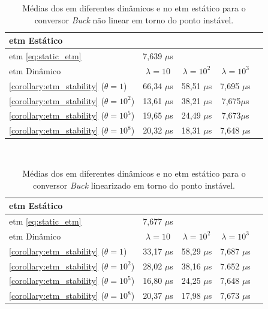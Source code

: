 \begin{table}[H]
  \centering
  \setlength{\tabcolsep}{10pt}
  \captionsetup{justification=centering}
  \begin{tabular}{lcccc}
    \toprule
      \acrshort{etm} Estático \\
    \midrule
    \acrshort{etm} \eqref{eq:static_etm} & 7,639 $\mu$s \\
    \bottomrule
    \toprule
    \acrshort{etm} Dinâmico & $\lambda = 10$ & $\lambda = 10^2$ & $\lambda = 10^3$ \\
    \midrule
      \autoref{corollary:etm_stability} ($\theta = 1$) & 66,34 $\mu$s & 58,51 $\mu$s & 7,695 $\mu$s   \\
      \autoref{corollary:etm_stability} ($\theta = 10^2$) & 13,61 $\mu$s & 38,21 $\mu$s & 7,675$\mu$s\\
      \autoref{corollary:etm_stability} ($\theta = 10^5$) & 19,65 $\mu$s & 24,49 $\mu$s & 7,673$\mu$s\\
      \autoref{corollary:etm_stability} ($\theta = 10^8$) & 20,32 $\mu$s & 18,31 $\mu$s & 7,648 $\mu$s\\
    \bottomrule
  \end{tabular} \\[4pt]
  \caption{Médias dos  em diferentes  dinâmicos e no \acrshort{etm} estático \newline para o conversor \textit{Buck} não linear em torno do ponto instável.}
  \label{table:dynamic_etm_approaches_buck_sl}
\end{table}

\begin{table}[H]
  \centering
  \setlength{\tabcolsep}{10pt}
  \captionsetup{justification=centering}
  \begin{tabular}{lcccc}
    \toprule
      \acrshort{etm} Estático \\
    \midrule
      \acrshort{etm} \eqref{eq:static_etm} & 7,677 $\mu$s \\
    \bottomrule
    \toprule
      \acrshort{etm} Dinâmico & $\lambda = 10$ & $\lambda = 10^2$ & $\lambda = 10^3$ \\
    \midrule
      \autoref{corollary:etm_stability} ($\theta = 1$) & 33,17 $\mu$s & 58,29 $\mu$s & 7,687 $\mu$s \\
      \autoref{corollary:etm_stability} ($\theta = 10^2$) & 28,02 $\mu$s &  38,16 $\mu$s & 7.652  $\mu$s\\
      \autoref{corollary:etm_stability} ($\theta = 10^5$) & 16,80 $\mu$s & 24,25 $\mu$s & 7,648  $\mu$s\\
      \autoref{corollary:etm_stability} ($\theta = 10^8$) & 20,37 $\mu$s & 17,98 $\mu$s & 7,673  $\mu$s\\
    \bottomrule
  \end{tabular} \\[4pt]
  \caption{Médias dos  em diferentes  dinâmicos e no \acrshort{etm} estático \newline para o conversor \textit{Buck} linearizado em torno do ponto instável.}
  \label{table:dynamic_etm_approaches_buck_snl}
\end{table}


